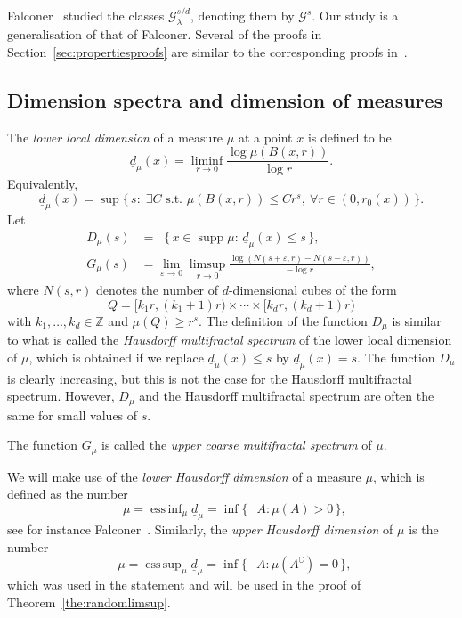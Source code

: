 \documentclass[AHL,Unicode,longabstracts]{cedram}
\DeclareMathOperator{\dimh}{dim_H}
\DeclareMathOperator{\ldimh}{\underline{dim}_H}
\DeclareMathOperator{\udimh}{\overline{dim}_H}
\DeclareMathOperator{\supp}{supp}
\DeclareMathOperator*{\essinf}{ess\,inf}
\DeclareMathOperator*{\esssup}{ess\,sup}
\newcommand*{\dimh}{\mathrm{dim}_{\mathrm{H}}}
\let\oldexists\exists
\renewcommand*{\exists}{\mathrel{\oldexists}}
\let\oldforall\forall
\renewcommand*{\forall}{\mathrel{\oldforall}}
\begin{document}
Falconer~\cite{falconer1, falconer2} studied the classes $\mathscr{G}_\lambda^{s/d}$, denoting them by $\mathscr{G}^s$. Our study is a generalisation of that of Falconer. Several of the proofs in Section~\ref{sec:propertiesproofs} are similar to the corresponding proofs in~\cite{falconer2}.


\subsection{Dimension spectra and dimension of measures} \label{ssec:dimensiondefinitions}

The {\em lower local dimension} of a measure $\mu$ at a point $x$ is defined to be
\[
\underline{d}_\mu (x) = \liminf_{r \to 0} \frac{\log \mu (B(x,r))}{\log r}.
\]
Equivalently,
\[
\underline{d}_\mu (x) = \sup \{\, s :\; \exists C \text{ s.t. } \mu (B(x,r)) \leq C r^s, \ \forall r \in (0, r_0 (x)) \,\}.
\]
Let
\begin{align*}
D_\mu (s) &= \dimh \{\, x \in \supp \mu : \, \underline{d}_\mu (x)
\leq s \,\},\\
G_\mu (s) &= \lim_{\varepsilon \to 0} \limsup_{r \to 0} \frac{\log (N (s + \varepsilon, r) - N (s - \varepsilon, r))}{- \log r},
\end{align*}
where $N (s, r)$ denotes the number of $d$-dimensional cubes of the form
\[
Q = [k_1 r, (k_1+1) r) \times \cdots \times [k_d r, (k_d+1) r)
\]
with $k_1, \ldots, k_d \in \mathbb{Z}$ and $\mu (Q) \geq r^s$. The definition of the function $D_\mu$ is similar to what is called the
\emph{Hausdorff multifractal spectrum} of the lower local dimension of $\mu$, which is obtained if we replace $\underline{d}_\mu (x) \leq s$ by $\underline{d}_\mu (x) = s$. The function $D_\mu$ is clearly increasing, but this is not the case for the Hausdorff multifractal spectrum. However, $D_\mu$ and the Hausdorff multifractal spectrum are often the same for small values of $s$.

The function $G_\mu$ is called the \emph{upper coarse multifractal spectrum} of $\mu$.

We will make use of the {\em lower Hausdorff dimension} of a measure $\mu$, which is defined as the number
\[
\ldimh \mu = \essinf_{\mu} \underline{d}_\mu = \inf \{\, \dimh A :
\mu (A) > 0 \,\},
\]
see for instance Falconer~\cite[Proposition~10.2]{falconertechniques}. Similarly, the {\em upper Hausdorff dimension} of $\mu$ is the number
\[
\udimh \mu = \esssup_{\mu} \underline{d}_\mu = \inf \{\, \dimh A :
\mu (A^\complement) = 0 \,\},
\]
which was used in the statement and will be used in the proof of Theorem~\ref{the:randomlimsup}.
\end{document}
